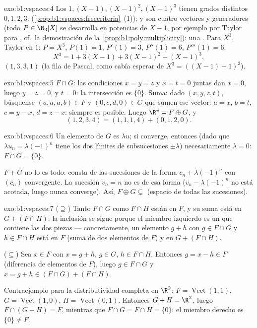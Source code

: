 \begin{solution}{exo:b1:vspaces:4}
Los  $1, (X-1), (X-1)^2, (X-1)^3$ tienen grados distintos
$0, 1, 2, 3$:  (\cref{prop:b1:vspaces:freecriteria}~(1)); y son
cuatro vectores  y generadores (todo $P \in \R_3[X]$ se
desarrolla en potencias de $X - 1$, por ejemplo por Taylor para
, cf.\ la demostración de
la~\cref{prop:b1:poly:multiplicity}): una . Para $X^3$, Taylor en
$1$: $P = X^3$, $P(1) = 1$, $P'(1) = 3$, $P''(1) = 6$,
$P'''(1) = 6$:
\[
X^3 = 1 + 3(X - 1) + 3(X-1)^2 + (X-1)^3 ,
\]
 $(1, 3, 3, 1)$ (la fila de Pascal, como cabía esperar de
$X^3 = ((X-1)+1)^3$).
\end{solution}

\begin{solution}{exo:b1:vspaces:5}
$F \cap G$: las condiciones $x = y = z$ y $x = t = 0$ juntas dan
$x = 0$, luego $y = z = 0$, y $t = 0$: la intersección es $\{0\}$.
Suma: dado $(x,y,z,t)$, búsquense $(a,a,a,b) \in F$ y
$(0,c,d,0) \in G$ que sumen ese vector: $a = x$, $b = t$,
$c = y - x$, $d = z - x$: siempre es posible. Luego
$\R^4 = F \oplus G$, y
\[
(1,2,3,4) = (1,1,1,4) + (0,1,2,0) .
\]
\end{solution}

\begin{solution}{exo:b1:vspaces:6}
Un elemento de $G$ es $\lambda u$; si converge, entonces (dado que
$\lambda u_n = \lambda(-1)^n$ tiene los dos límites de subsucesiones
$\pm \lambda$) necesariamente $\lambda = 0$: $F \cap G = \{0\}$.

$F + G$ no lo es todo: consta de las sucesiones de la forma
$c_n + \lambda(-1)^n$ con $(c_n)$ convergente. La sucesión $v_n = n$
no es de esa forma ($v_n - \lambda(-1)^n$ no está acotada, luego
nunca converge). Así, $F \oplus G \subsetneq$ (espacio de todas las
sucesiones).
\end{solution}

\begin{solution}{exo:b1:vspaces:7}
($\supseteq$) Tanto $F \cap G$ como $F \cap H$ están en $F$, y su
suma está en $G + (F \cap H)$: la inclusión se sigue porque el
miembro izquierdo es un  que contiene las dos piezas ---
concretamente, un elemento $g + h$ con $g \in F\cap G$ y
$h \in F \cap H$ está en $F$ (suma de dos elementos de $F$) y en
$G + (F \cap H)$.

($\subseteq$) Sea $x \in F$ con $x = g + h$, $g \in G$,
$h \in F \cap H$. Entonces $g = x - h \in F$ (diferencia de elementos
de $F$), luego $g \in F \cap G$ y $x = g + h \in (F \cap G) + (F \cap H)$.

Contraejemplo para la distributividad completa en $\R^2$:
$F = \operatorname{Vect}(1,1)$, $G = \operatorname{Vect}(1,0)$,
$H = \operatorname{Vect}(0,1)$. Entonces $G + H = \R^2$, luego
$F \cap (G+H) = F$, mientras que $F \cap G = F \cap H = \{0\}$: el
miembro derecho es $\{0\} \neq F$.
\end{solution}

